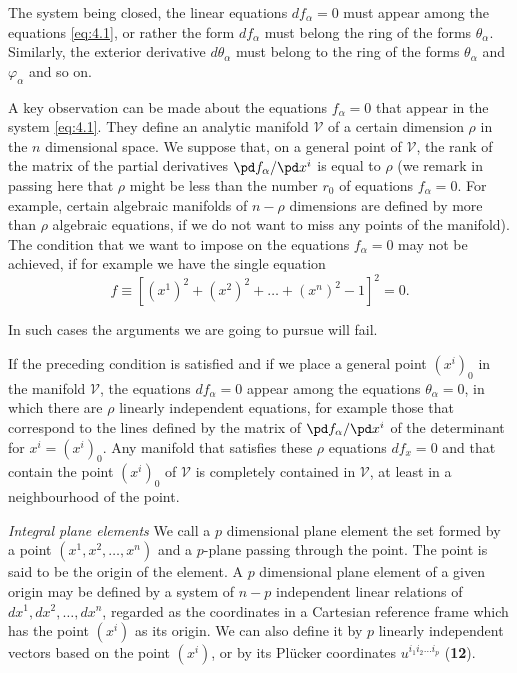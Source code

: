 The system being closed, the linear equations $df_{\alpha}=0$ must appear among the equations \eqref{eq:4.1}, or rather the form $df_{\alpha}$ must belong the ring of the forms $\theta_{\alpha}$. Similarly, the exterior derivative $d\theta_{\alpha}$ must belong to the ring of the forms $\theta_{\alpha}$ and $\varphi_{\alpha}$ and so on.


\vspace{12pt}\fsec A key observation can be made about the equations $f_{\alpha}=0$ that appear in the system \eqref{eq:4.1}. They define an analytic manifold $\mathcal{V}$ of a certain dimension $\rho$ in the $n$ dimensional space. We suppose that, on a general point of $\mathcal{V}$, the rank of the matrix of the partial derivatives $\pd f_{\alpha}/\pd x^{i}$ is equal to $\rho$ (we remark in passing here that $\rho$ might be less than the number $r_{0}$ of equations $f_{\alpha}=0$. For example, certain algebraic manifolds of $n-\rho$ dimensions are defined by more than $\rho$ algebraic equations, if we do not want to miss any points of the manifold). The condition that we want to impose on the equations $f_{\alpha}=0$ may not be achieved, if for example we have the single equation
\[
f\equiv[(x^{1})^{2}+(x^{2})^{2}+\dots+(x^{n})^{2}-1]^{2}=0.
\]

In such cases the arguments we are going to pursue will fail.

If the preceding condition is satisfied and if we place a general point $(x^{i})_{0}$ in the manifold $\mathcal{V}$, the equations $df_{\alpha}=0$ appear among the equations $\theta_{\alpha}=0$, in which there are $\rho$ linearly independent equations, for example those that correspond to the lines defined by the matrix of $\pd f_{\alpha}/\pd x^{i}$ of the determinant for $x^{i}=(x^{i})_{0}$. Any manifold that satisfies these $\rho$ equations $df_{x}=0$ and that contain the point $(x^{i})_{0}$ of $\mathcal{V}$ is completely contained in $\mathcal{V}$, at least in a neighbourhood of the point.


\vspace{12pt}\fsec \emph{Integral plane elements} We call a $p$ dimensional plane element the set formed by a point $(x^{1},x^{2},\dots,x^{n})$ and a $p$-plane passing through the point. The point is said to be the origin of the element. A $p$ dimensional plane element of a given origin may be defined by a system of $n-p$ independent linear relations of $dx^{1},dx^{2},\dots,dx^{n}$, regarded as the coordinates in a Cartesian reference frame which has the point $(x^{i})$ as its origin. We can also define it by $p$ linearly independent vectors based on the point $(x^{i})$, or by its Pl\"ucker coordinates $u^{i_{1}i_{2}\dots i_{p}}$ (\textsection\textbf{12}).

